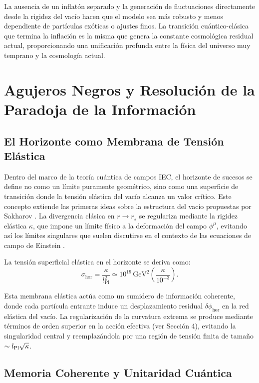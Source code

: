 \documentclass[11pt,a4paper]{article}
\begin{document}
La ausencia de un inflatón separado y la generación de fluctuaciones directamente desde la rigidez del vacío hacen que el modelo sea más robusto y menos dependiente de partículas exóticas o ajustes finos. La transición cuántico-clásica que termina la inflación es la misma que genera la constante cosmológica residual actual, proporcionando una unificación profunda entre la física del universo muy temprano y la cosmología actual.

\section{Agujeros Negros y Resolución de la Paradoja de la Información}

\subsection{El Horizonte como Membrana de Tensión Elástica}

Dentro del marco de la teoría cuántica de campos IEC, el horizonte de sucesos se define no como un límite puramente geométrico, sino como una superficie de transición donde la tensión elástica del vacío alcanza un valor crítico. Este concepto extiende las primeras ideas sobre la estructura del vacío propuestas por Sakharov \cite{Sakharov, 1967}. La divergencia clásica en \( r \to r_s \) se regulariza mediante la rigidez elástica \( \kappa \), que impone un límite físico a la deformación del campo \( \phi^\mu \), evitando así los límites singulares que suelen discutirse en el contexto de las ecuaciones de campo de Einstein \cite{Einstein, 1915}.

La tensión superficial elástica en el horizonte se deriva como:
\begin{equation}
	\sigma_{\text{hor}} = \frac{\kappa}{l_{\text{Pl}}^2} \simeq 10^{19} \, \text{GeV}^2 \left( \frac{\kappa}{10^{-3}} \right).
\end{equation}

Esta membrana elástica actúa como un sumidero de información coherente, donde cada partícula entrante induce un desplazamiento residual \( \delta \phi_{\text{hor}} \) en la red elástica del vacío. La regularización de la curvatura extrema se produce mediante términos de orden superior en la acción efectiva (ver Sección 4), evitando la singularidad central y reemplazándola por una región de tensión finita de tamaño \( \sim l_{\rm Pl} \sqrt{\kappa} \).

\subsection{Memoria Coherente y Unitaridad Cuántica}
\end{document}
